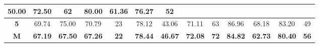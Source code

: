 \begin{table}[H]
{\begin{tabular}{c|cccc|cccc|cccc|}
			\multicolumn{1}{c|}{50.00} &
			\multicolumn{1}{c|}{72.50} &
			62 &
			\multicolumn{1}{c|}{80.00} &
			\multicolumn{1}{c|}{61.36} &
			\multicolumn{1}{c|}{76.27} &
			52 \\ \hline
			\multicolumn{1}{|c|}{\textbf{5}} &
			\multicolumn{1}{c|}{69.74} &
			\multicolumn{1}{c|}{75.00} &
			\multicolumn{1}{c|}{70.79} &
			23 &
			\multicolumn{1}{c|}{78.12} &
			\multicolumn{1}{c|}{43.06} &
			\multicolumn{1}{c|}{71.11} &
			63 &
			\multicolumn{1}{c|}{86.96} &
			\multicolumn{1}{c|}{68.18} &
			\multicolumn{1}{c|}{83.20} &
			49 \\ \hline
			\multicolumn{1}{|c|}{{\color[HTML]{00009B} \textbf{M}}} &
			\multicolumn{1}{c|}{{\color[HTML]{00009B} \textbf{67.19}}} &
			\multicolumn{1}{c|}{{\color[HTML]{00009B} \textbf{67.50}}} &
			\multicolumn{1}{c|}{{\color[HTML]{00009B} \textbf{67.26}}} &
			{\color[HTML]{00009B} \textbf{22}} &
			\multicolumn{1}{c|}{{\color[HTML]{00009B} \textbf{78.44}}} &
			\multicolumn{1}{c|}{{\color[HTML]{00009B} \textbf{46.67}}} &
			\multicolumn{1}{c|}{{\color[HTML]{00009B} \textbf{72.08}}} &
			{\color[HTML]{00009B} \textbf{72}} &
			\multicolumn{1}{c|}{{\color[HTML]{00009B} \textbf{84.82}}} &
			\multicolumn{1}{c|}{{\color[HTML]{00009B} \textbf{62.73}}} &
			\multicolumn{1}{c|}{{\color[HTML]{00009B} \textbf{80.40}}} &
			{\color[HTML]{00009B} \textbf{56}} \\ \hline
		\end{tabular}%
	}
\end{table}